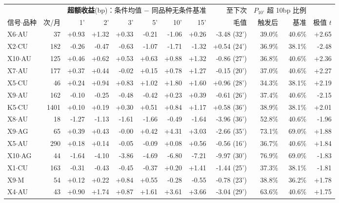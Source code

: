 \setlength{\tabcolsep}{3pt}
\begin{tabular}{lrrrrrrrrrrr}
\toprule
& & \multicolumn{6}{c}{\textbf{超额收益}(bp)：条件均值 $-$ 同品种无条件基准} & 至下次 & \multicolumn{2}{c}{$P_{10'}$ 超 10bp 比例} & \\
\cmidrule(lr){3-8}\cmidrule(lr){10-11}
信号$\cdot$品种 & 次/月 & 1' & 2' & 3' & 5' & 10' & 15' & 毛值 & 触发后 & 基准 & 极值 $t$ \\
\midrule
X6$\cdot$AU & 37 & +0.93 & +1.32 & +0.33 & -0.21 & -1.06 & +0.26 & -3.48 (32') & 39.0\% & 40.6\% & +2.65 \\
X2$\cdot$CU & 182 & -0.26 & -0.47 & -0.63 & -1.07 & -1.71 & -1.32 & +0.54 (24') & 36.9\% & 38.1\% & -2.48 \\
X10$\cdot$AU & 125 & +0.46 & +0.62 & +0.53 & +0.63 & +0.88 & +1.32 & -0.86 (27') & 36.8\% & 40.6\% & +2.36 \\
X7$\cdot$AU & 177 & +0.37 & +0.44 & -0.02 & +0.15 & +0.78 & +1.27 & -0.15 (20') & 37.0\% & 40.6\% & +2.27 \\
X5$\cdot$CU & 46 & +0.24 & +0.94 & +0.83 & +1.02 & +1.80 & +1.60 & +0.96 (28') & 34.3\% & 38.1\% & +2.19 \\
X9$\cdot$AU & 162 & -0.10 & -0.25 & -0.48 & -0.42 & +0.23 & +0.39 & -0.61 (26') & 37.4\% & 40.6\% & -2.15 \\
K5$\cdot$CU & 1401 & +0.10 & +0.19 & +0.30 & +0.51 & +0.84 & +1.17 & +0.58 (36') & 38.9\% & 38.1\% & +2.01 \\
X8$\cdot$AU & 18 & -1.27 & -1.13 & -1.61 & -1.66 & -0.49 & -1.64 & -3.96 (36') & 52.8\% & 40.6\% & -1.96 \\
X9$\cdot$AG & 65 & +0.39 & +0.43 & -0.00 & +0.42 & +4.31 & +3.03 & -2.66 (35') & 73.1\% & 69.0\% & +1.88 \\
X5$\cdot$AU & 290 & +0.18 & +0.14 & -0.05 & -0.09 & +0.08 & +0.56 & -0.56 (16') & 36.7\% & 40.6\% & +1.84 \\
X10$\cdot$AG & 44 & -1.64 & -4.10 & -3.86 & -4.69 & -6.80 & -7.21 & -9.97 (30') & 76.9\% & 69.0\% & -1.83 \\
X1$\cdot$CU & 163 & -0.31 & -0.43 & -0.45 & -0.37 & +0.20 & +1.41 & -1.44 (25') & 37.3\% & 38.1\% & -1.81 \\
X9$\cdot$M & 54 & +0.12 & +0.22 & +0.84 & +0.55 & -0.28 & -0.55 & -0.78 (23') & 38.8\% & 36.2\% & +1.78 \\
X4$\cdot$AU & 43 & +0.90 & +1.74 & +0.87 & +1.61 & +3.61 & +3.66 & -3.04 (29') & 63.6\% & 40.6\% & +1.75 \\
\bottomrule
\end{tabular}
